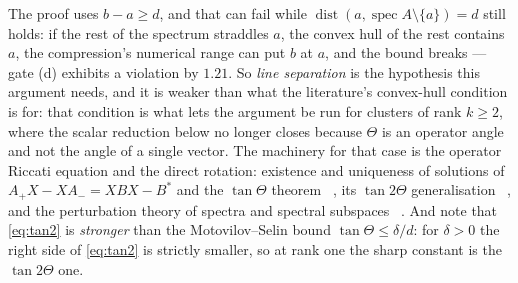 \begin{remark}
\label{rem:numerical-range}
The proof uses $b-a\ge d$, and that can fail while $\operatorname{dist}(a,\operatorname{spec}A
\setminus\{a\})=d$ still holds: if the rest of the spectrum straddles $a$, the convex hull of the
rest contains $a$, the compression's numerical range can put $b$ at $a$, and the bound breaks ---
gate (d) exhibits a violation by $1.21$. So \emph{line separation} is
the hypothesis this argument needs, and it is weaker than what the literature's convex-hull
condition is for: that condition is what lets the argument be run for clusters of rank $k\ge2$,
where the scalar reduction below no longer closes because $\Theta$ is an operator angle and not
the angle of a single vector. The machinery for that case is the operator Riccati equation and
the direct rotation: existence and uniqueness of solutions of $A_+X-XA_-=XBX-B^*$ and the
$\tan\Theta$ theorem \Cc\ \cite{kmm1}, its $\tan 2\Theta$ generalisation \Cc\ \cite{kmm2}, and
the perturbation theory of spectra and spectral subspaces \Cc\ \cite{kmm3}. And note that \eqref{eq:tan2} is \emph{stronger} than the
Motovilov--Selin bound $\tan\Theta\le\delta/d$: for $\delta>0$ the right side of
\eqref{eq:tan2} is strictly smaller, so at rank one the sharp constant is the $\tan 2\Theta$ one.
\end{remark}

